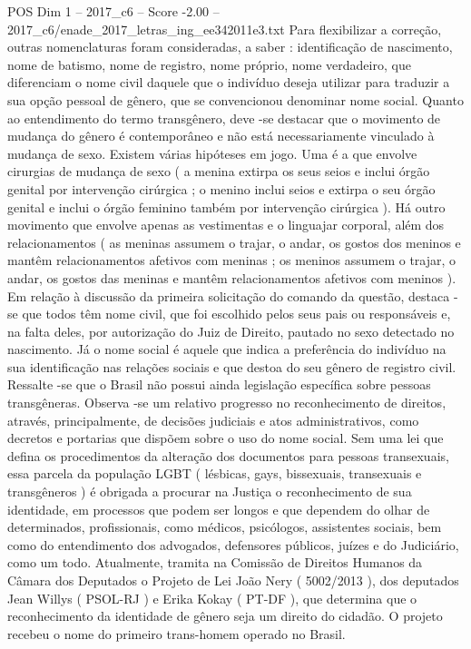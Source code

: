 \begin{textsample}{POS Dim 1 – 2017\_c6 – Score -2.00 – 2017\_c6/enade\_2017\_letras\_ing\_ee342011e3.txt}
Para flexibilizar a correção, outras nomenclaturas foram consideradas, a saber : identificação de nascimento, nome de batismo, nome de registro, nome próprio, nome verdadeiro, que diferenciam o nome civil daquele que o indivíduo deseja utilizar para traduzir a sua opção pessoal de gênero, que se convencionou denominar nome social.
Quanto ao entendimento do termo transgênero, deve -se destacar que o movimento de mudança do gênero é contemporâneo e não está necessariamente vinculado à mudança de sexo.
Existem várias hipóteses em jogo.
Uma é a que envolve cirurgias de mudança de sexo ( a menina extirpa os seus seios e inclui órgão genital por intervenção cirúrgica ; o menino inclui seios e extirpa o seu órgão genital e inclui o órgão feminino também por intervenção cirúrgica ).
Há outro movimento que envolve apenas as vestimentas e o linguajar corporal, além dos relacionamentos ( as meninas assumem o trajar, o andar, os gostos dos meninos e mantêm relacionamentos afetivos com meninas ; os meninos assumem o trajar, o andar, os gostos das meninas e mantêm relacionamentos afetivos com meninos ).
Em relação à discussão da primeira solicitação do comando da questão, destaca -se que todos têm nome civil, que foi escolhido pelos seus pais ou responsáveis e, na falta deles, por autorização do Juiz de Direito, pautado no sexo detectado no nascimento.
Já o nome social é aquele que indica a preferência do indivíduo na sua identificação nas relações sociais e que destoa do seu gênero de registro civil.
Ressalte -se que o Brasil não possui ainda legislação específica sobre pessoas transgêneras.
Observa -se um relativo progresso no reconhecimento de direitos, através, principalmente, de decisões judiciais e atos administrativos, como decretos e portarias que dispõem sobre o uso do nome social.
Sem uma lei que defina os procedimentos da alteração dos documentos para pessoas transexuais, essa parcela da população LGBT ( lésbicas, gays, bissexuais, transexuais e transgêneros ) é obrigada a procurar na Justiça o reconhecimento de sua identidade, em processos que podem ser longos e que dependem do olhar de determinados, profissionais, como médicos, psicólogos, assistentes sociais, bem como do entendimento dos advogados, defensores públicos, juízes e do Judiciário, como um todo.
Atualmente, tramita na Comissão de Direitos Humanos da Câmara dos Deputados o Projeto de Lei João Nery ( 5002/2013 ), dos deputados Jean Willys ( PSOL-RJ ) e Erika Kokay ( PT-DF ), que determina que o reconhecimento da identidade de gênero seja um direito do cidadão.
O projeto recebeu o nome do primeiro trans-homem operado no Brasil.

\end{textsample}
